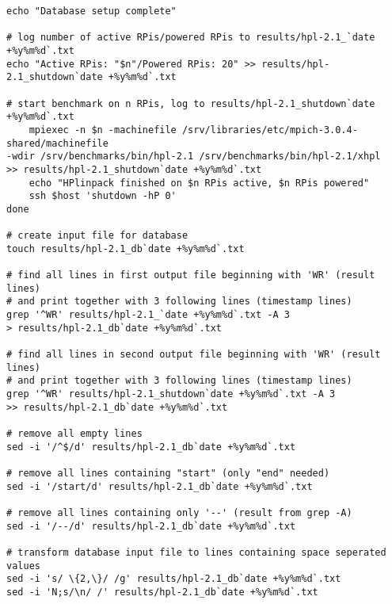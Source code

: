 \begin{verbatim}
echo "Database setup complete"

# log number of active RPis/powered RPis to results/hpl-2.1_`date +%y%m%d`.txt
echo "Active RPis: "$n"/Powered RPis: 20" >> results/hpl-2.1_shutdown`date +%y%m%d`.txt

# start benchmark on n RPis, log to results/hpl-2.1_shutdown`date +%y%m%d`.txt                        
    mpiexec -n $n -machinefile /srv/libraries/etc/mpich-3.0.4-shared/machinefile 
-wdir /srv/benchmarks/bin/hpl-2.1 /srv/benchmarks/bin/hpl-2.1/xhpl 
>> results/hpl-2.1_shutdown`date +%y%m%d`.txt
    echo "HPlinpack finished on $n RPis active, $n RPis powered"
    ssh $host 'shutdown -hP 0'
done 

# create input file for database                                                                                                                                            
touch results/hpl-2.1_db`date +%y%m%d`.txt

# find all lines in first output file beginning with 'WR' (result lines) 
# and print together with 3 following lines (timestamp lines)                                       
grep '^WR' results/hpl-2.1_`date +%y%m%d`.txt -A 3 
> results/hpl-2.1_db`date +%y%m%d`.txt

# find all lines in second output file beginning with 'WR' (result lines) 
# and print together with 3 following lines (timestamp lines)                                      
grep '^WR' results/hpl-2.1_shutdown`date +%y%m%d`.txt -A 3 
>> results/hpl-2.1_db`date +%y%m%d`.txt

# remove all empty lines                                                                                                                                                    
sed -i '/^$/d' results/hpl-2.1_db`date +%y%m%d`.txt

# remove all lines containing "start" (only "end" needed)                                                                                                                   
sed -i '/start/d' results/hpl-2.1_db`date +%y%m%d`.txt

# remove all lines containing only '--' (result from grep -A)                                                                                                               
sed -i '/--/d' results/hpl-2.1_db`date +%y%m%d`.txt

# transform database input file to lines containing space seperated values                                                                                                  
sed -i 's/ \{2,\}/ /g' results/hpl-2.1_db`date +%y%m%d`.txt
sed -i 'N;s/\n/ /' results/hpl-2.1_db`date +%y%m%d`.txt
                                                                                                                                              

\end{verbatim}
